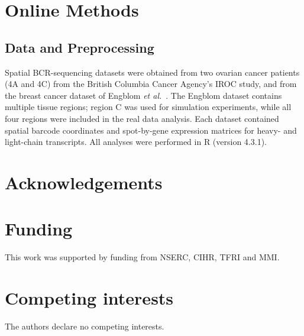 \documentclass[pdflatex,sn-mathphys-num]{sn-jnl}%
\theoremstyle{thmstyleone}%
\theoremstyle{thmstyletwo}%
\theoremstyle{thmstylethree}%
\begin{document}


\clearpage

\section*{Online Methods}

\subsection*{Data and Preprocessing}

Spatial BCR-sequencing datasets were obtained from two ovarian cancer patients (4A and 4C) from the British Columbia Cancer Agency’s IROC study, and from the breast cancer dataset of Engblom \textit{et al.}~\cite{engblom2023repair}. The Engblom dataset contains multiple tissue regions; region C was used for simulation experiments, while all four regions were included in the real data analysis. Each dataset contained spatial barcode coordinates and spot-by-gene expression matrices for heavy- and light-chain transcripts. All analyses were performed in R (version 4.3.1).

\section*{Acknowledgements}


\section*{Funding}
This work was supported by funding from NSERC, CIHR,  TFRI and MMI.

\section*{Competing interests}
The authors declare no competing interests.
\end{document}
